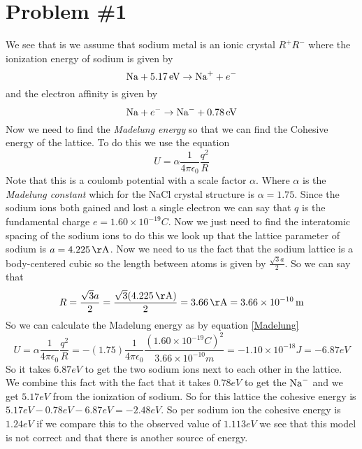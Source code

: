 \documentclass[11pt]{article}
\numberwithin{equation}{section}
\begin{document}


\section{Problem \#1}
We see that is we assume that sodium metal is an ionic crystal $R^{+}R^{-}$ where the ionization energy of sodium is given by
$$\textnormal{Na}+5.17\, \mathrm{eV}\rightarrow \textnormal{Na}^{+}+e^{-}$$
and the electron affinity is given by
$$\textnormal{Na}+e^{-}\rightarrow \textnormal{Na}^{-}+0.78\, \mathrm{eV}$$
Now we need to find the \emph{Madelung energy} so that we can find the Cohesive energy of the lattice. To do this we use the equation 
\begin{equation}
\label{Madelung}
U = \alpha\frac{1}{4\pi\epsilon_0}\frac{q^2}{R}
\end{equation}
Note that this is a coulomb potential with a scale factor $\alpha$. Where $\alpha$ is the \emph{Madelung constant} which for the NaCl crystal structure is $\alpha = 1.75$. Since the sodium ions both gained and lost a single electron we can say that $q$ is the fundamental charge $e = 1.60\times10^{-19}\unit{C}$. Now we just need to find the interatomic spacing of the sodium ions to do this we look up that the lattice parameter of sodium is $a=4.225\unit{\AA}$. Now we need to us the fact that the sodium lattice is a body-centered cubic so the length between atoms is given by $\frac{\sqrt{3}a}{2}$. So we can say that 
$$R = \frac{\sqrt{3}a}{2} = \frac{\sqrt{3}(4.225\unit{\AA})}{2} = 3.66\unit{\AA} = 3.66\times10^{-10}\unit{m}$$
So we can calculate the Madelung energy as by equation \ref{Madelung}
$$U = \alpha\frac{1}{4\pi\epsilon_0}\frac{q^2}{R} =  -(1.75)\frac{1}{4\pi\epsilon_0}\frac{(1.60\times10^{-19}\unit{C})^2}{3.66\times10^{-10}\unit{m}} = -1.10\times10^{-18}\unit{J} = -6.87\unit{eV}$$ 
So it takes $6.87\unit{eV}$ to get the two sodium ions next to each other in the lattice. We combine this fact with the fact that it takes $0.78\unit{eV}$ to get the $\textnormal{Na}^{-}$ and we get $5.17\unit{eV}$ from the ionization of sodium. So for this lattice the cohesive energy is $5.17\unit{eV}-0.78\unit{eV}-6.87\unit{eV} = -2.48\unit{eV}$. So per sodium ion the cohesive energy is $1.24\unit{eV}$ if we compare this to the observed value of $1.113\unit{eV}$ we see that this model is not correct and that there is another source of energy.
\end{document}
